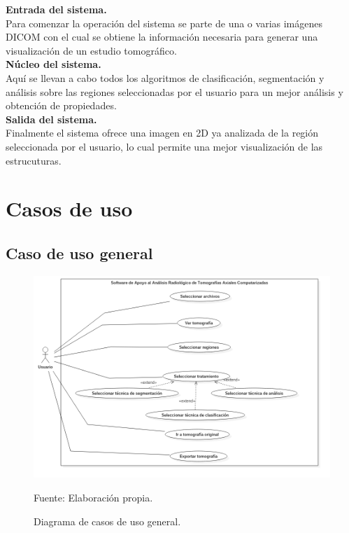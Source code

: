 \documentclass[12pt]{report}
\begin{document}
\textbf{Entrada del sistema.}\\ Para comenzar la operación del sistema se parte de una o varias imágenes DICOM con el cual se obtiene la información necesaria para generar una visualización de un estudio tomográfico.\\

\textbf{Núcleo del sistema.}\\ Aquí se llevan a cabo todos los algoritmos de clasificación, segmentación y análisis sobre las regiones seleccionadas por el usuario para un mejor análisis y obtención de propiedades.\\

\textbf{Salida del sistema.}\\ Finalmente el sistema ofrece una imagen en 2D ya analizada de la región seleccionada  por el usuario, lo cual permite una mejor visualización de las estrucuturas.\\

\section{Casos de uso}
\subsection{Caso de uso general}

\begin{figure}[H]
\centering
\includegraphics[width = 11 cm, height =  13 cm]{MainCasos}
\caption{Diagrama de casos de uso general.}
Fuente: Elaboración propia.
\end{figure}
\end{document}
